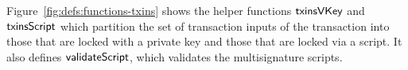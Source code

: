 Figure~\ref{fig:defs:functions-txins} shows the helper functions
$\mathsf{txinsVKey}$ and $\mathsf{txinsScript}$ which partition the set of transaction
inputs of the transaction into those that are locked with a private key and
those that are locked via a script.
It also defines $\mathsf{validateScript}$, which validates the multisignature scripts.

\clearpage

